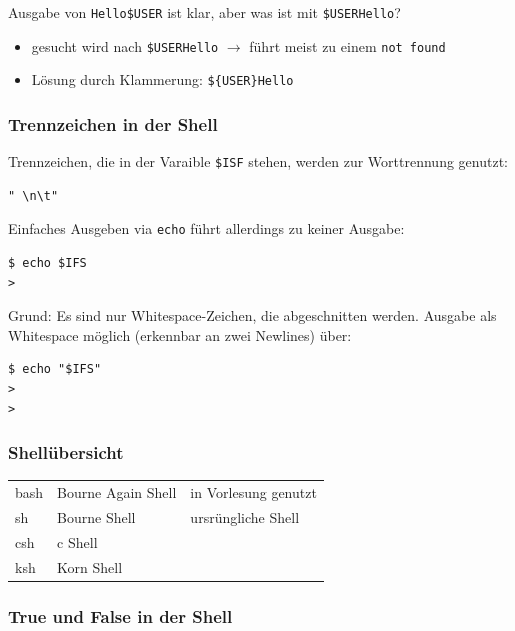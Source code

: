 		Ausgabe von \texttt{Hello\$USER} ist klar, aber was ist mit \texttt{\$USERHello}?
		\begin{itemize}
			\item gesucht wird nach \texttt{\$USERHello} $\rightarrow$ führt meist zu einem \texttt{not found}
			\item Lösung durch Klammerung: \texttt{\$\{USER\}Hello}
		\end{itemize}


	\subsubsection*{Trennzeichen in der Shell} %
	\label{ssub:trennzeichen_in_der_shell}
	
		Trennzeichen, die in der Varaible \texttt{\$ISF} stehen, werden zur Worttrennung genutzt:
		\lstShell
		\begin{lstlisting}
" \n\t"
		\end{lstlisting}
		Einfaches Ausgeben via \texttt{echo} führt allerdings zu keiner Ausgabe:
		\lstShell
		\begin{lstlisting}
$ echo $IFS
>
		\end{lstlisting}
		Grund: Es sind nur Whitespace-Zeichen, die abgeschnitten werden. Ausgabe als Whitespace möglich (erkennbar an zwei Newlines) über:
		\lstShell
		\begin{lstlisting}
$ echo "$IFS"
>
>
		\end{lstlisting}


	\subsubsection*{Shellübersicht} %
	\label{ssub:shell_bersicht}
	
		\begin{tabular}{lll}
			bash	&	Bourne Again Shell 	&	in Vorlesung genutzt\\
			sh		&	Bourne Shell 		&	ursrüngliche Shell\\
			csh		&	c Shell 			&	\\
			ksh		&	Korn Shell 			&	
		\end{tabular}


	\subsubsection*{True und False in der Shell} %
	\label{ssub:true_und_false_in_der_shell}
	
